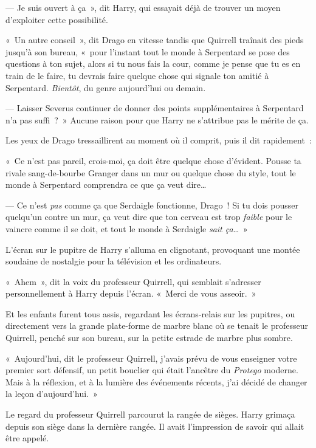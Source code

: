 --- Je suis ouvert à ça~», dit Harry, qui essayait déjà de trouver un moyen d'exploiter cette possibilité.

«~Un autre conseil~», dit Drago en vitesse tandis que Quirrell traînait des pieds jusqu'à son bureau, «~pour l'instant tout le monde à Serpentard se pose des questions à ton sujet, alors si tu nous fais la cour, comme je pense que tu es en train de le faire, tu devrais faire quelque chose qui signale ton amitié à Serpentard. \emph{Bientôt}, du genre aujourd'hui ou demain.

--- Laisser Severus continuer de donner des points supplémentaires à Serpentard n'a pas suffi~?~» Aucune raison pour que Harry ne s'attribue pas le mérite de ça.

Les yeux de Drago tressaillirent au moment où il comprit, puis il dit rapidement~:

«~Ce n'est pas pareil, crois-moi, ça doit être quelque chose d'évident. Pousse ta rivale sang-de-bourbe Granger dans un mur ou quelque chose du style, tout le monde à Serpentard comprendra ce que ça veut dire…

--- Ce n'est \emph{pas} comme ça que Serdaigle fonctionne, Drago~! Si tu dois pousser quelqu'un contre un mur, ça veut dire que ton cerveau est trop \emph{faible} pour le vaincre comme il se doit, et tout le monde à Serdaigle \emph{sait ça}…~»

L'écran sur le pupitre de Harry s'alluma en clignotant, provoquant une montée soudaine de nostalgie pour la télévision et les ordinateurs.

«~Ahem~», dit la voix du professeur Quirrell, qui semblait s'adresser personnellement à Harry depuis l'écran. «~Merci de vous asseoir.~»

\later

Et les enfants furent tous assis, regardant les écrans-relais sur les pupitres, ou directement vers la grande plate-forme de marbre blanc où se tenait le professeur Quirrell, penché sur son bureau, sur la petite estrade de marbre plus sombre.

«~Aujourd'hui, dit le professeur Quirrell, j'avais prévu de vous enseigner votre premier sort défensif, un petit bouclier qui était l'ancêtre du \emph{Protego} moderne. Mais à la réflexion, et à la lumière des événements récents, j'ai décidé de changer la leçon d'aujourd'hui.~»

Le regard du professeur Quirrell parcourut la rangée de sièges. Harry grimaça depuis son siège dans la dernière rangée. Il avait l'impression de savoir qui allait être appelé.

